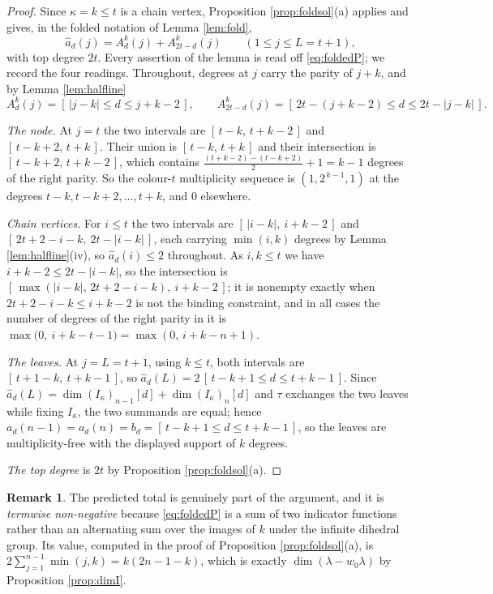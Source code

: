\documentclass[reqno]{amsart}
\theoremstyle{plain}
\theoremstyle{definition}
\newtheorem{remark}[theorem]{Remark}
\newcommand{\la}{\lambda}
\newcommand{\ka}{\kappa}
\begin{document}
\begin{proof}
Since $\ka=k\le t$ is a chain vertex, Proposition \ref{prop:foldsol}(a)
applies and gives, in the folded notation of Lemma \ref{lem:fold},
\begin{equation}\label{eq:foldedP}
   \hat a_d(j)=A^{k}_d(j)+A^{k}_{2t-d}(j)\qquad(1\le j\le L=t+1),
\end{equation}
with top degree $2t$.  Every assertion of the lemma is read off
\eqref{eq:foldedP}; we record the four readings.  Throughout, degrees at $j$
carry the parity of $j+k$, and by Lemma \ref{lem:halfline}
\[
   A^{k}_d(j)=[\,|j-k|\le d\le j+k-2\,],
   \qquad
   A^{k}_{2t-d}(j)=[\,2t-(j+k-2)\le d\le 2t-|j-k|\,].
\]

\emph{The node.}  At $j=t$ the two intervals are $[\,t-k,\,t+k-2\,]$ and
$[\,t-k+2,\,t+k\,]$.  Their union is $[\,t-k,\,t+k\,]$ and their intersection
is $[\,t-k+2,\,t+k-2\,]$, which contains
$\frac{(t+k-2)-(t-k+2)}{2}+1=k-1$ degrees of the right parity.  So the
colour-$t$ multiplicity sequence is $(1,2^{\,k-1},1)$ at the degrees
$t-k,t-k+2,\dots,t+k$, and $0$ elsewhere.

\emph{Chain vertices.}  For $i\le t$ the two intervals are
$[\,|i-k|,\ i+k-2\,]$ and $[\,2t+2-i-k,\ 2t-|i-k|\,]$, each carrying
$\min(i,k)$ degrees by Lemma \ref{lem:halfline}(iv), so $\hat a_d(i)\le2$
throughout.  As $i,k\le t$ we have $i+k-2\le 2t-|i-k|$, so the intersection is
$[\,\max(|i-k|,\,2t+2-i-k),\ i+k-2\,]$; it is nonempty exactly when
$2t+2-i-k\le i+k-2$ is not the binding constraint, and in all cases the number
of degrees of the right parity in it is
$\max\bigl(0,\ i+k-t-1\bigr)=\max(0,\,i+k-n+1)$.

\emph{The leaves.}  At $j=L=t+1$, using $k\le t$, both intervals are
$[\,t+1-k,\ t+k-1\,]$, so $\hat a_d(L)=2\,[\,t-k+1\le d\le t+k-1\,]$.  Since
$\hat a_d(L)=\dim(I_\ka)_{n-1}[d]+\dim(I_\ka)_n[d]$ and $\tau$ exchanges the
two leaves while fixing $I_\ka$, the two summands are equal; hence
$a_d(n-1)=a_d(n)=b_d=[\,t-k+1\le d\le t+k-1\,]$, so the leaves are
multiplicity-free with the displayed support of $k$ degrees.

\emph{The top degree} is $2t$ by Proposition \ref{prop:foldsol}(a).
\end{proof}

\begin{remark}\label{rem:imagetotal}
The predicted total is genuinely part of the argument, and it is
\emph{termwise non-negative} because \eqref{eq:foldedP} is a sum of two
indicator functions rather than an alternating sum over the images of $k$
under the infinite dihedral group.  Its value, computed in the proof of
Proposition \ref{prop:foldsol}(a), is
$2\sum_{j=1}^{n-1}\min(j,k)=k(2n-1-k)$, which is exactly
$\dim(\la-w_0\la)$ by Proposition \ref{prop:dimI}.
\end{remark}
\end{document}

